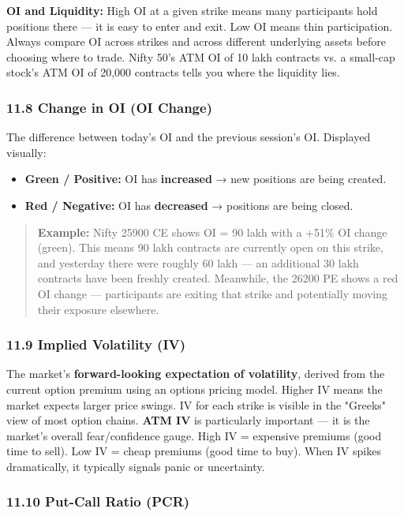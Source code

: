 \documentclass[12pt,openany]{book}
\begin{document}
\textbf{OI and Liquidity:} High OI at a given strike means many participants hold positions there — it is easy to enter and exit. Low OI means thin participation. Always compare OI across strikes and across different underlying assets before choosing where to trade. Nifty 50's ATM OI of 10 lakh contracts vs. a small-cap stock's ATM OI of 20,000 contracts tells you where the liquidity lies.

\subsubsection{11.8 Change in OI (OI Change)}

The difference between today's OI and the previous session's OI. Displayed visually:
\begin{itemize}[leftmargin=*]
    \item \textbf{Green / Positive:} OI has \textbf{increased} → new positions are being created.
    \item \textbf{Red / Negative:} OI has \textbf{decreased} → positions are being closed.
\end{itemize}

\begin{quote}
\textbf{Example:} Nifty 25900 CE shows OI = 90 lakh with a +51\% OI change (green). This means 90 lakh contracts are currently open on this strike, and yesterday there were roughly 60 lakh — an additional 30 lakh contracts have been freshly created. Meanwhile, the 26200 PE shows a red OI change — participants are exiting that strike and potentially moving their exposure elsewhere.
\end{quote}

\subsubsection{11.9 Implied Volatility (IV)}

The market's \textbf{forward-looking expectation of volatility}, derived from the current option premium using an options pricing model. Higher IV means the market expects larger price swings. IV for each strike is visible in the "Greeks" view of most option chains. \textbf{ATM IV} is particularly important — it is the market's overall fear/confidence gauge. High IV = expensive premiums (good time to sell). Low IV = cheap premiums (good time to buy). When IV spikes dramatically, it typically signals panic or uncertainty.

\subsubsection{11.10 Put-Call Ratio (PCR)}
\end{document}
